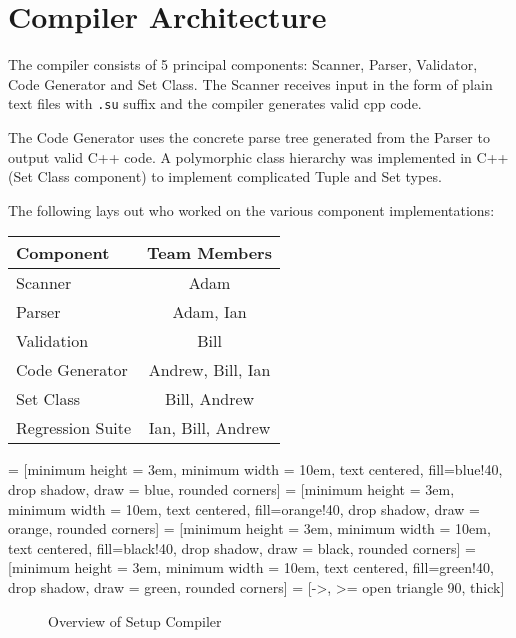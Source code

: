 \chapter{Compiler Architecture}
The compiler consists of 5 principal components: Scanner, Parser, Validator, Code Generator and Set Class.  The Scanner receives input in the form of plain text files with \verb|.su| suffix and the compiler generates valid cpp code.  

The Code Generator uses the concrete parse tree generated from the Parser to output valid C++ code.  A polymorphic class hierarchy was implemented in C++ (Set Class component) to implement complicated Tuple and Set types.

The following lays out who worked on the various component implementations:

\begin{center}
\begin{tabular}{lc}
\toprule
\textbf{Component} &\textbf{Team Members}\\\midrule
Scanner	&Adam\\
Parser	&Adam, Ian\\
Validation &Bill\\
Code Generator &Andrew, Bill, Ian\\
Set Class &Bill, Andrew\\
Regression Suite &Ian, Bill, Andrew\\\bottomrule
\end{tabular}
\end{center}

 = [minimum height = 3em, minimum width = 10em, text centered, fill=blue!40, drop shadow, draw = blue, rounded corners]
 = [minimum height = 3em, minimum width = 10em, text centered, fill=orange!40, drop shadow, draw = orange, rounded corners]
 = [minimum height = 3em, minimum width = 10em, text centered, fill=black!40, drop shadow, draw = black, rounded corners]
 = [minimum height = 3em, minimum width = 10em, text centered, fill=green!40, drop shadow, draw = green, rounded corners]
 = [->, >= open triangle 90, thick]

\begin{figure}[h]
\label{arch}
\caption{Overview of Setup Compiler}
\end{figure}

